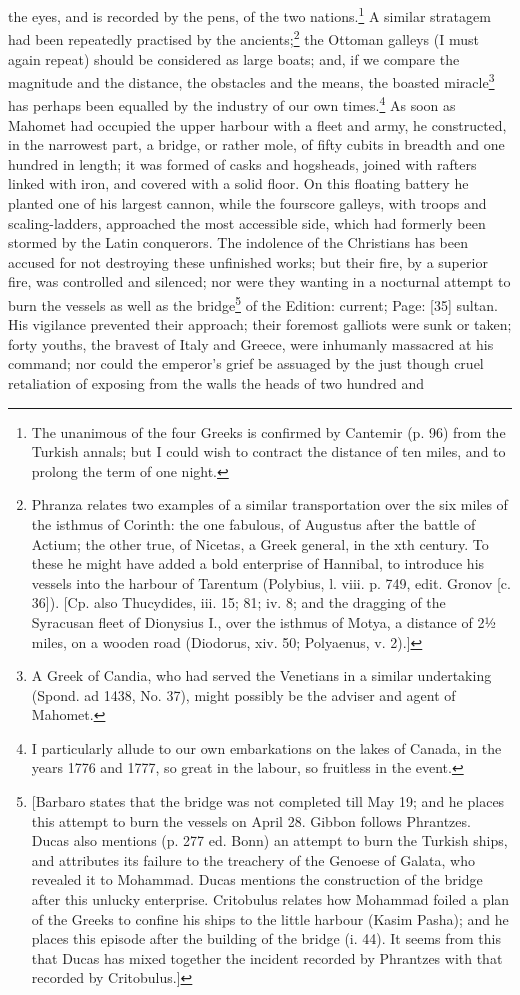 the eyes, and is recorded by the pens, of the two nations.\footnote{The unanimous of the four Greeks is confirmed by Cantemir (p. 96) from the Turkish annals; but I could wish to contract the distance of ten miles, and to prolong the term of one night.} A similar stratagem had been repeatedly practised by the ancients;\footnote{Phranza relates two examples of a similar transportation over the six miles of the isthmus of Corinth: the one fabulous, of Augustus after the battle of Actium; the other true, of Nicetas, a Greek general, in the xth century. To these he might have added a bold enterprise of Hannibal, to introduce his vessels into the harbour of Tarentum (Polybius, l. viii. p. 749, edit. Gronov [c. 36]). [Cp. also Thucydides, iii. 15; 81; iv. 8; and the dragging of the Syracusan fleet of Dionysius I., over the isthmus of Motya, a distance of 2½ miles, on a wooden road (Diodorus, xiv. 50; Polyaenus, v. 2).]} the Ottoman galleys (I must again repeat) should be considered as large boats; and, if we compare the magnitude and the distance, the obstacles and the means, the boasted miracle\footnote{A Greek of Candia, who had served the Venetians in a similar undertaking (Spond. ad 1438, No. 37), might possibly be the adviser and agent of Mahomet.} has perhaps been equalled by the industry of our own times.\footnote{I particularly allude to our own embarkations on the lakes of Canada, in the years 1776 and 1777, so great in the labour, so fruitless in the event.} As soon as Mahomet had occupied the upper harbour with a fleet and army, he constructed, in the narrowest part, a bridge, or rather mole, of fifty cubits in breadth and one hundred in length; it was formed of casks and hogsheads, joined with rafters linked with iron, and covered with a solid floor. On this floating battery he planted one of his largest cannon, while the fourscore galleys, with troops and scaling-ladders, approached the most accessible side, which had formerly been stormed by the Latin conquerors. The indolence of the Christians has been accused for not destroying these unfinished works; but their fire, by a superior fire, was controlled and silenced; nor were they wanting in a nocturnal attempt to burn the vessels as well as the bridge\footnote{[Barbaro states that the bridge was not completed till May 19; and he places this attempt to burn the vessels on April 28. Gibbon follows Phrantzes. Ducas also mentions (p. 277 ed. Bonn) an attempt to burn the Turkish ships, and attributes its failure to the treachery of the Genoese of Galata, who revealed it to Mohammad. Ducas mentions the construction of the bridge after this unlucky enterprise. Critobulus relates how Mohammad foiled a plan of the Greeks to confine his ships to the little harbour (Kasim Pasha); and he places this episode after the building of the bridge (i. 44). It seems from this that Ducas has mixed together the incident recorded by Phrantzes with that recorded by Critobulus.]} of the Edition: current; Page: [35] sultan. His vigilance prevented their approach; their foremost galliots were sunk or taken; forty youths, the bravest of Italy and Greece, were inhumanly massacred at his command; nor could the emperor\texthebrew{}’s grief be assuaged by the just though cruel retaliation of exposing from the walls the heads of two hundred and 